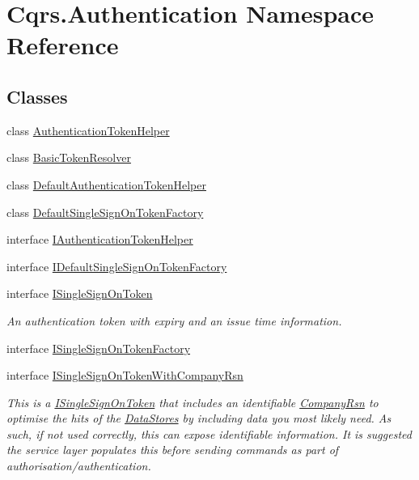 \hypertarget{namespaceCqrs_1_1Authentication}{}\section{Cqrs.\+Authentication Namespace Reference}
\label{namespaceCqrs_1_1Authentication}
\subsection*{Classes}
\begin{DoxyCompactItemize}
\item 
class \hyperlink{classCqrs_1_1Authentication_1_1AuthenticationTokenHelper}{Authentication\+Token\+Helper}
\item 
class \hyperlink{classCqrs_1_1Authentication_1_1BasicTokenResolver}{Basic\+Token\+Resolver}
\item 
class \hyperlink{classCqrs_1_1Authentication_1_1DefaultAuthenticationTokenHelper}{Default\+Authentication\+Token\+Helper}
\item 
class \hyperlink{classCqrs_1_1Authentication_1_1DefaultSingleSignOnTokenFactory}{Default\+Single\+Sign\+On\+Token\+Factory}
\item 
interface \hyperlink{interfaceCqrs_1_1Authentication_1_1IAuthenticationTokenHelper}{I\+Authentication\+Token\+Helper}
\item 
interface \hyperlink{interfaceCqrs_1_1Authentication_1_1IDefaultSingleSignOnTokenFactory}{I\+Default\+Single\+Sign\+On\+Token\+Factory}
\item 
interface \hyperlink{interfaceCqrs_1_1Authentication_1_1ISingleSignOnToken}{I\+Single\+Sign\+On\+Token}
\begin{DoxyCompactList}\small\item\em An authentication token with expiry and an issue time information. \end{DoxyCompactList}\item 
interface \hyperlink{interfaceCqrs_1_1Authentication_1_1ISingleSignOnTokenFactory}{I\+Single\+Sign\+On\+Token\+Factory}
\item 
interface \hyperlink{interfaceCqrs_1_1Authentication_1_1ISingleSignOnTokenWithCompanyRsn}{I\+Single\+Sign\+On\+Token\+With\+Company\+Rsn}
\begin{DoxyCompactList}\small\item\em This is a \hyperlink{interfaceCqrs_1_1Authentication_1_1ISingleSignOnToken}{I\+Single\+Sign\+On\+Token} that includes an identifiable \hyperlink{interfaceCqrs_1_1Authentication_1_1ISingleSignOnTokenWithCompanyRsn_a26ffa6ca2e583f0ecc440b68fe3edd52_a26ffa6ca2e583f0ecc440b68fe3edd52}{Company\+Rsn} to optimise the hits of the \hyperlink{}{Data\+Stores} by including data you most likely need. As such, if not used correctly, this can expose identifiable information. It is suggested the service layer populates this before sending commands as part of authorisation/authentication. \end{DoxyCompactList}\item 

\end{DoxyCompactItemize}
